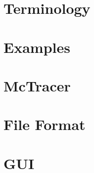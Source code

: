 \documentclass{scrartcl}
\begin{document}
\maketitle
\tableofcontents
\newpage

\section{Terminology} 
\newpage
\section{Examples} 
\newpage
\section{McTracer} 
\newpage
\section{File Format} 
\newpage
\section{GUI} 
\end{document}
